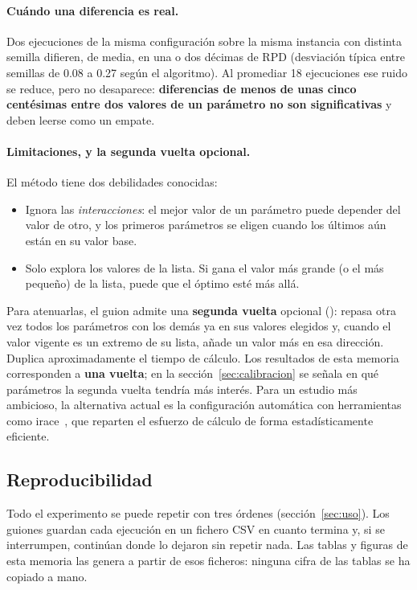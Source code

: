 \paragraph{Cuándo una diferencia es real.} Dos ejecuciones de la misma configuración sobre la
misma instancia con distinta semilla difieren, de media, en una o dos décimas de RPD
(desviación típica entre semillas de 0.08 a 0.27 según el algoritmo). Al promediar 18
ejecuciones ese ruido se reduce, pero no desaparece: \textbf{diferencias de menos de unas
cinco centésimas entre dos valores de un parámetro no son significativas} y deben leerse como
un empate.

\paragraph{Limitaciones, y la segunda vuelta opcional.} El método tiene dos debilidades
conocidas:
\begin{itemize}
  \item Ignora las \emph{interacciones}: el mejor valor de un parámetro puede depender del
        valor de otro, y los primeros parámetros se eligen cuando los últimos aún están en
        su valor base.
  \item Solo explora los valores de la lista. Si gana el valor más grande (o el más
        pequeño) de la lista, puede que el óptimo esté más allá.
\end{itemize}
Para atenuarlas, el guion  admite una \textbf{segunda vuelta} opcional
(): repasa otra vez todos los parámetros con los demás ya
en sus valores elegidos y, cuando el valor vigente es un extremo de su lista, añade un valor
más en esa dirección. Duplica aproximadamente el tiempo de cálculo. Los resultados de esta
memoria corresponden a \textbf{una vuelta}; en la sección~\ref{sec:calibracion} se señala en
qué parámetros la segunda vuelta tendría más interés. Para un estudio más ambicioso, la
alternativa actual es la configuración automática con herramientas como
irace~\cite{irace}, que reparten el esfuerzo de cálculo de forma estadísticamente eficiente.

\subsection{Reproducibilidad}

Todo el experimento se puede repetir con tres órdenes (sección~\ref{sec:uso}). Los guiones
guardan cada ejecución en un fichero CSV en cuanto termina y, si se interrumpen, continúan
donde lo dejaron sin repetir nada. Las tablas y figuras de esta memoria las genera
 a partir de esos ficheros: ninguna cifra de las tablas se ha copiado
a mano.
